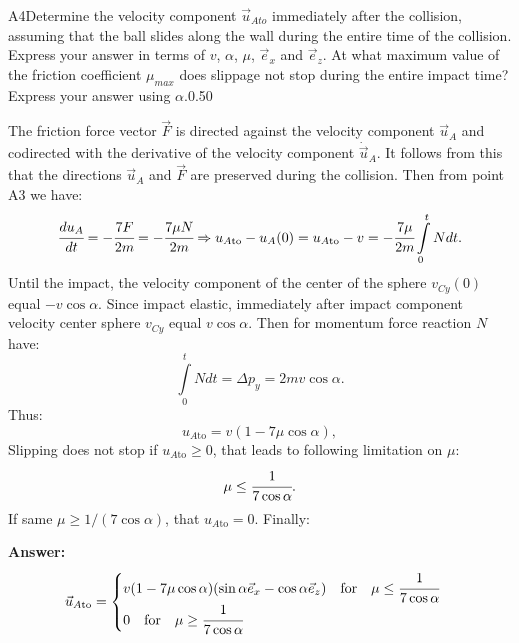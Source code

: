 \documentclass[11pt,a4paper]{article}
\begin{document}
\begin{solcard}{A4}{Determine the velocity component $\vec{u}_{Ato}$ immediately after the collision, assuming that the ball slides along the wall during the entire time of the collision. Express your answer in terms of $v$, $\alpha$, $\mu$, $\vec{e}_x$ and $\vec{e}_z$. At what maximum value of the friction coefficient $\mu_{max}$ does slippage not stop during the entire impact time? Express your answer using $\alpha$.}{0.50}

The friction force vector $\vec{F}$ is directed against the velocity component $\vec{u}_A$ and codirected with the derivative of the velocity component $\dot{\vec{u}}_A$. It follows from this that the directions $\vec{u}_A$ and $\vec{F}$ are preserved during the collision. Then from point $\mathrm{A3}$ we have: $$\cfrac{du_A}{dt}=-\cfrac{7F}{2m}=-\cfrac{7\mu N}{2m}\Rightarrow u_{A\text{to}}-u_A(0)=u_{A\text{to}}-v=-\cfrac{7\mu}{2m}\int\limits_{0}^t Ndt{.} $$Until the impact, the velocity component of the center of the sphere $v_{Cy}(0)$ equal $-v\cos\alpha$. Since impact elastic, immediately after impact component velocity center sphere $v_{Cy}$ equal $v\cos\alpha$. Then for momentum force reaction $N$ have: $$\int\limits_{0}^tNdt=\Delta{p}_y=2mv\cos\alpha{.} $$Thus: $$u_{A\text{to}}=v(1-7\mu\cos\alpha){,} $$Slipping does not stop if $u_{A\text{to}} \geq 0$, that leads to following limitation on $\mu$: $$\mu\leq\cfrac{1}{7\cos\alpha}{.} $$If same $\mu\geq 1/(7\cos\alpha)$, that $u_{A\text{to}}=0$. Finally:

\par\smallskip\noindent\textbf{Answer:} $$\vec{u}_{A\text{to}}= \begin{cases} v(1-7\mu\cos\alpha)(\sin\alpha\vec{e}_x-\cos\alpha\vec{e}_z)\quad\text{for}\quad\mu\leq\cfrac{1}{7\cos\alpha}\\ 0\quad\text{for}\quad\mu\geq\cfrac{1}{7\cos\alpha} \end{cases} $$
\end{solcard}
\end{document}

